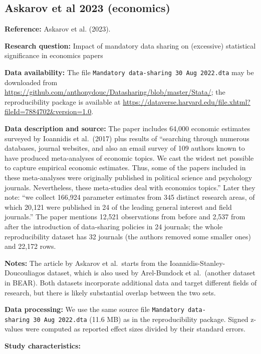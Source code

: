 \documentclass[
  11pt,
]{article}
\begin{document}
\newpage

\subsection{Askarov et al 2023
(economics)}\label{askarov-et-al-2023-economics}

\textbf{Reference:} Askarov et al. (2023).

\textbf{Research question:} Impact of mandatory data sharing on
(excessive) statistical significance in economics papers

\textbf{Data availability:} The file
\texttt{Mandatory\ data-sharing\ 30\ Aug\ 2022.dta} may be downloaded
from
\url{https://github.com/anthonydouc/Datasharing/blob/master/Stata/}; the
reproducibility package is available at
\url{https://dataverse.harvard.edu/file.xhtml?fileId=7884702&version=1.0}.

\textbf{Data description and source:} The paper includes 64,000 economic
estimates surveyed by Ioannidis et al.~(2017) plus results of
``searching through numerous databases, journal websites, and also an
email survey of 109 authors known to have produced meta-analyses of
economic topics. We cast the widest net possible to capture empirical
economic estimates. Thus, some of the papers included in these
meta-analyses were originally published in political science and
psychology journals. Nevertheless, these meta-studies deal with
economics topics.'' Later they note: ``we collect 166,924 parameter
estimates from 345 distinct research areas, of which 20,121 were
published in 24 of the leading general interest and field journals.''
The paper mentions 12,521 observations from before and 2,537 from after
the introduction of data-sharing policies in 24 journals; the whole
reproducibility dataset has 32 journals (the authors removed some
smaller ones) and 22,172 rows.

\textbf{Notes:} The article by Askarov et al.~starts from the
Ioannidis-Stanley-Doucouliagos dataset, which is also used by
Arel-Bundock et al.~(another dataset in BEAR). Both datasets incorporate
additional data and target different fields of research, but there is
likely substantial overlap between the two sets.

\textbf{Data processing:} We use the same source file
\texttt{Mandatory\ data-sharing\ 30\ Aug\ 2022.dta} (11.6 MB) as in the
reproducibility package. Signed z-values were computed as reported
effect sizes divided by their standard errors.

\textbf{Study characteristics:}
\end{document}
